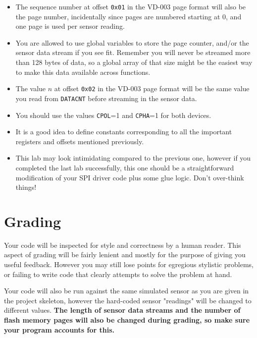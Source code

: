 \documentclass{article}
\begin{document}
\begin{itemize}

	\item The sequence number at offset \texttt{0x01} in the VD-003 page
		format will also be the page number, incidentally since pages
		are numbered starting at 0, and one page is used per sensor
		reading.

	\item You are allowed to use global variables to store the page
		counter, and/or the sensor data stream if you see fit. Remember
		you will never be streamed more than 128 bytes of data, so a
		global array of that size might be the easiest way to make this
		data available across functions.

	\item The value $n$ at offset \texttt{0x02} in the VD-003 page format
		will be the same value you read from \texttt{DATACNT} before
		streaming in the sensor data.

	\item You should use the values \texttt{CPOL}=1 and \texttt{CPHA}=1 for
		both devices.

	\item It is a good idea to define constants corresponding to all the
		important registers and offsets mentioned previously.

	\item This lab may look intimidating compared to the previous one,
		however if you completed the last lab successfully, this one
		should be a straightforward modification of your SPI driver
		code plus some glue logic. Don't over-think things!

\end{itemize}

\section{Grading}

Your code will be inspected for style and correctness by a human reader. This
aspect of grading will be fairly lenient and mostly for the purpose of giving
you useful feedback. However you may still lose points for egregious stylistic
problems, or failing to write code that clearly attempts to solve the problem
at hand.

Your code will also be run against the same simulated sensor as you are given
in the project skeleton, however the hard-coded sensor "readings" will be
changed to different values. \textbf{The length of sensor data streams and the
number of flash memory pages will also be changed during grading, so make sure
your program accounts for this.}
\end{document}
